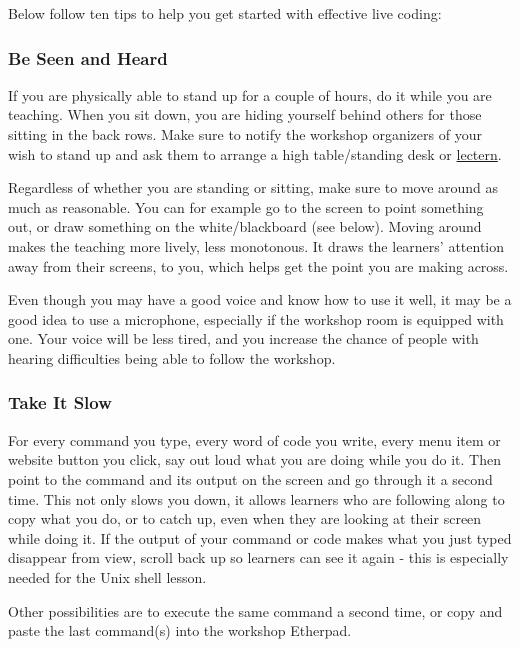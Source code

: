 Below follow ten tips to help you get started with effective live
coding:

\subsubsection{Be Seen and Heard}\label{be-seen-and-heard}

If you are physically able to stand up for a couple of hours, do it
while you are teaching. When you sit down, you are hiding yourself
behind others for those sitting in the back rows. Make sure to notify
the workshop organizers of your wish to stand up and ask them to arrange
a high table/standing desk or
\href{https://en.wikipedia.org/wiki/Lectern\#Academic\_context}{lectern}.

Regardless of whether you are standing or sitting, make sure to move
around as much as reasonable. You can for example go to the screen to
point something out, or draw something on the white/blackboard (see
below). Moving around makes the teaching more lively, less monotonous.
It draws the learners' attention away from their screens, to you, which
helps get the point you are making across.

Even though you may have a good voice and know how to use it well, it
may be a good idea to use a microphone, especially if the workshop room
is equipped with one. Your voice will be less tired, and you increase
the chance of people with hearing difficulties being able to follow the
workshop.

\subsubsection{Take It Slow}\label{take-it-slow}

For every command you type, every word of code you write, every menu
item or website button you click, say out loud what you are doing while
you do it. Then point to the command and its output on the screen and go
through it a second time. This not only slows you down, it allows
learners who are following along to copy what you do, or to catch up,
even when they are looking at their screen while doing it. If the output
of your command or code makes what you just typed disappear from view,
scroll back up so learners can see it again - this is especially needed
for the Unix shell lesson.

Other possibilities are to execute the same command a second time, or
copy and paste the last command(s) into the workshop Etherpad.


